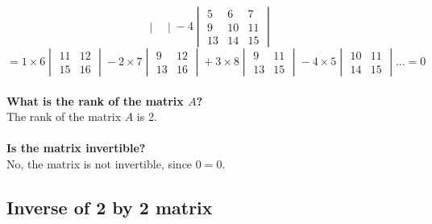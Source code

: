 \documentclass[oneside]{book}
\begin{document}
{\[\begin{vmatrix}
        \end{vmatrix} - 4 \begin{vmatrix}
            5 & 6 & 7 \\
            9 & 10 & 11 \\
            13 & 14 & 15
        \end{vmatrix}
    \]
    \[
        = 1 \times 6 \begin{vmatrix}
            11 & 12 \\
            15 & 16
        \end{vmatrix} - 2 \times 7 \begin{vmatrix}
            9 & 12 \\
            13 & 16
        \end{vmatrix} + 3 \times 8 \begin{vmatrix}
            9 & 11 \\
            13 & 15
        \end{vmatrix} - 4 \times 5 \begin{vmatrix}
            10 & 11 \\
            14 & 15
        \end{vmatrix} \text{...} = 0
    \]
    \\
    \textbf{What is the rank of the matrix $A$? } \\The rank of the matrix $A$ is 2.\\\\
    \textbf{Is the matrix invertible? } \\No, the matrix is not invertible, since $0 = 0$.\\
}

\subsection{Inverse of 2 by 2 matrix}
\end{document}
